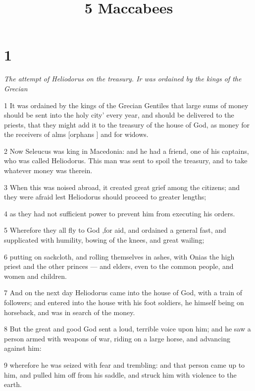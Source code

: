 

\title{5 Maccabees}


\chapter{1}

\par \textit{The attempt of Heliodorus on the treasury. Ir was ordained by the kings of the Grecian}

\par 1 It was ordained by the kings of the Grecian Gentiles that large sums of money should be sent into the holy city’ every year, and should be delivered to the priests, that they might add it to the treasury of the house of God, as money for the receivers of alms [orphans ] and for widows. 

\par 2 Now Seleucus was king in Macedonia: and he had a friend, one of his captains, who was called Heliodorus. This man was sent to spoil the treasury, and to take whatever money was therein. 

\par 3 When this was noised abroad, it created great grief among the citizens; and they were afraid lest Heliodorus should proceed to greater lengths; 

\par 4 as they had not sufficient power to prevent him from executing his orders. 

\par 5 Wherefore they all fly to God ,for aid, and ordained a general fast, and supplicated with humility, bowing of the knees, and great wailing; 

\par 6 putting on sackcloth, and rolling themselves in ashes, with Onias the high priest and the other princes — and elders, even to the common people, and women and children. 

\par 7 And on the next day Heliodorus came into the house of God, with a train of followers; and entered into the house with his foot soldiers, he himself being on horseback, and was in search of the money. 

\par 8 But the great and good God sent a loud, terrible voice upon him; and he saw a person armed with weapons of war, riding on a large horse, and advancing against him: 

\par 9 wherefore he was seized with fear and trembling: and that person came up to him, and pulled him off from his saddle, and struck him with violence to the earth. 

